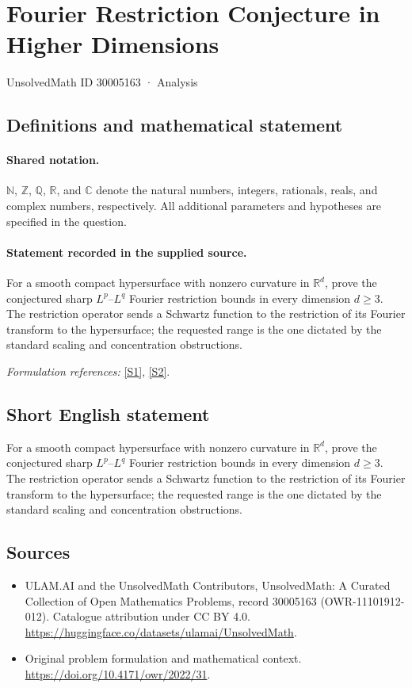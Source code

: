 \documentclass[11pt]{article}
\newcommand{\sref}[2]{\hyperlink{source:#1:#2}{[S#2]}}
\begin{document}
\setcounter{section}{30005162}
\section{Fourier Restriction Conjecture in Higher Dimensions}\label{30005163}
{\small UnsolvedMath ID 30005163 · Analysis}
\subsection{Definitions and mathematical statement}

\paragraph{Shared notation.}$\mathbb N$, $\mathbb Z$, $\mathbb Q$, $\mathbb R$, and $\mathbb C$ denote the natural numbers, integers, rationals, reals, and complex numbers, respectively. All additional parameters and hypotheses are specified in the question.


\paragraph{Statement recorded in the supplied source.}
For a smooth compact hypersurface with nonzero curvature in $\mathbb R^d$, prove the conjectured sharp $L^p$--$L^q$ Fourier restriction bounds in every dimension $d\geq3$. The restriction operator sends a Schwartz function to the restriction of its Fourier transform to the hypersurface; the requested range is the one dictated by the standard scaling and concentration obstructions.
\par\smallskip\textit{Formulation references:} \sref{30005163}{1}, \sref{30005163}{2}.
\subsection{Short English statement}
For a smooth compact hypersurface with nonzero curvature in $\mathbb R^d$, prove the conjectured sharp $L^p$--$L^q$ Fourier restriction bounds in every dimension $d\geq3$. The restriction operator sends a Schwartz function to the restriction of its Fourier transform to the hypersurface; the requested range is the one dictated by the standard scaling and concentration obstructions.
\subsection{Sources}
\begin{itemize}
\item[\hypertarget{source:30005163:1}{S1}] ULAM.AI and the UnsolvedMath Contributors, UnsolvedMath: A Curated Collection of Open Mathematics Problems, record 30005163 (OWR-11101912-012). Catalogue attribution under CC BY 4.0.
\url{https://huggingface.co/datasets/ulamai/UnsolvedMath}.
\item[\hypertarget{source:30005163:2}{S2}] Original problem formulation and mathematical context.
\url{https://doi.org/10.4171/owr/2022/31}.
\end{itemize}
\label{end:30005163}
\end{document}
